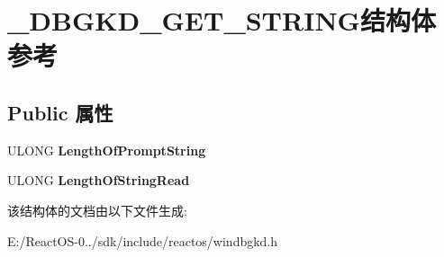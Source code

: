 \hypertarget{struct___d_b_g_k_d___g_e_t___s_t_r_i_n_g}{}\section{\+\_\+\+D\+B\+G\+K\+D\+\_\+\+G\+E\+T\+\_\+\+S\+T\+R\+I\+N\+G结构体 参考}
\label{struct___d_b_g_k_d___g_e_t___s_t_r_i_n_g}
\subsection*{Public 属性}
\begin{DoxyCompactItemize}
\item 
\mbox{\label{struct___d_b_g_k_d___g_e_t___s_t_r_i_n_g_aadaf9554f8af85b8ec238ac66c1b6ca8}} 
U\+L\+O\+NG {\bfseries Length\+Of\+Prompt\+String}
\item 
\mbox{\label{struct___d_b_g_k_d___g_e_t___s_t_r_i_n_g_a81c22935d0bda9891293ccc2db8b8d29}} 
U\+L\+O\+NG {\bfseries Length\+Of\+String\+Read}
\end{DoxyCompactItemize}


该结构体的文档由以下文件生成\+:\begin{DoxyCompactItemize}
\item 
E\+:/\+React\+O\+S-\/0../sdk/include/reactos/windbgkd.\+h\end{DoxyCompactItemize}
